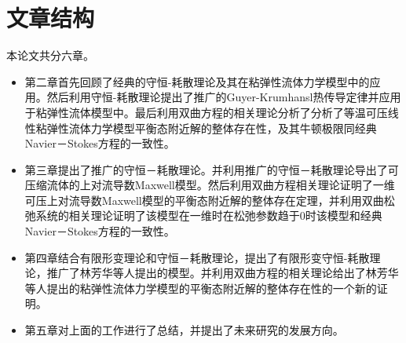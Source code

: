 \section{文章结构}
本论文共分六章。
\begin{itemize}
\item 第二章首先回顾了经典的守恒-耗散理论及其在粘弹性流体力学模型中的应用。然后利用守恒-耗散理论提出了推广的Guyer-Krumhansl热传导定律并应用于粘弹性流体模型中。最后利用双曲方程的相关理论分析了分析了等温可压线性粘弹性流体力学模型平衡态附近解的整体存在性，及其牛顿极限同经典Navier－Stokes方程的一致性。
\item 第三章提出了推广的守恒－耗散理论。并利用推广的守恒－耗散理论导出了可压缩流体的上对流导数Maxwell模型。然后利用双曲方程相关理论证明了一维可压上对流导数Maxwell模型的平衡态附近解的整体存在定理，并利用双曲松弛系统的相关理论证明了该模型在一维时在松弛参数趋于$0$时该模型和经典Navier－Stokes方程的一致性。
\item 第四章结合有限形变理论和守恒－耗散理论，提出了有限形变守恒-耗散理论，推广了林芳华等人提出的模型。并利用双曲方程的相关理论给出了林芳华等人提出的粘弹性流体力学模型的平衡态附近解的整体存在性的一个新的证明。
\item 第五章对上面的工作进行了总结，并提出了未来研究的发展方向。
\end{itemize}






